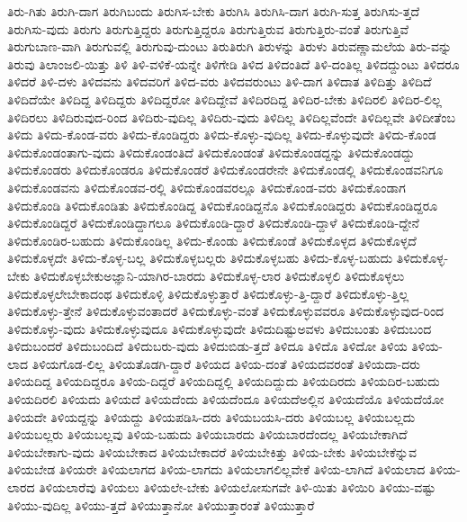 {ತಿರು-ಗಿತು
ತಿರುಗಿ-ದಾಗ
ತಿರುಗಿಬಂದು
ತಿರುಗಿಸ-ಬೇಕು
ತಿರುಗಿಸಿ
ತಿರುಗಿಸಿ-ದಾಗ
ತಿರುಗಿ-ಸುತ್ತ
ತಿರುಗಿಸು-ತ್ತದೆ
ತಿರುಗಿಸು-ವುದು
ತಿರುಗು
ತಿರುಗುತ್ತಿದ್ದರು
ತಿರುಗುತ್ತಿದ್ದರೂ
ತಿರುಗುತ್ತಿರುವ
ತಿರುಗುತ್ತಿರು-ವಂತೆ
ತಿರುಗುತ್ತಿವೆ
ತಿರುಗುಬಾಣ-ವಾಗಿ
ತಿರುಗುವಲ್ಲಿ
ತಿರುಗುವು-ದುಂಟು
ತಿರುತಿರುಗಿ
ತಿರುಳನ್ನು
ತಿರುಳು
ತಿರುವಣ್ಣಾಮಲೆಯ
ತಿರು-ವನ್ನು
ತಿರುವು
ತಿಲಾಂಜಲಿ-ಯಿತ್ತು
ತಿಳಿ
ತಿಳಿ-ವಳಿಕೆ-ಯನ್ನೇ
ತಿಳಿಗೇಡಿ
ತಿಳಿದ
ತಿಳಿದಂತಿದೆ
ತಿಳಿ-ದಂತಿಲ್ಲ
ತಿಳಿದದ್ದುಂಟು
ತಿಳಿದರೂ
ತಿಳಿದರೆ
ತಿಳಿ-ದಳು
ತಿಳಿದವನು
ತಿಳಿದವರಿಗೆ
ತಿಳಿದ-ವರು
ತಿಳಿದವರುಂಟು
ತಿಳಿ-ದಾಗ
ತಿಳಿದಾತ
ತಿಳಿದಿತ್ತು
ತಿಳಿದಿದೆ
ತಿಳಿದಿದೆಯೇ
ತಿಳಿದಿದ್ದ
ತಿಳಿದಿದ್ದರು
ತಿಳಿದಿದ್ದರೋ
ತಿಳಿದಿದ್ದೇವೆ
ತಿಳಿದಿರದಿದ್ದ
ತಿಳಿದಿರ-ಬೇಕು
ತಿಳಿದಿರಲಿ
ತಿಳಿದಿರ-ಲಿಲ್ಲ
ತಿಳಿದಿರಲು
ತಿಳಿದಿರುವುದ-ರಿಂದ
ತಿಳಿದಿರು-ವುದಿಲ್ಲ
ತಿಳಿದಿರು-ವುದು
ತಿಳಿದಿಲ್ಲ
ತಿಳಿದಿಲ್ಲವೆಂದೇ
ತಿಳಿದಿಲ್ಲವೇ
ತಿಳಿದೀತೆಂಬ
ತಿಳಿದು
ತಿಳಿದು-ಕೊಂಡ-ವರು
ತಿಳಿದು-ಕೊಂಡಿದ್ದರು
ತಿಳಿದು-ಕೊಳ್ಳು-ವುದಿಲ್ಲ
ತಿಳಿದು-ಕೊಳ್ಳುವುದೇ
ತಿಳಿದು-ಕೊಂಡ
ತಿಳಿದುಕೊಂಡಂತಾಗು-ವುದು
ತಿಳಿದುಕೊಂಡಂತಿದೆ
ತಿಳಿದುಕೊಂಡಂತೆ
ತಿಳಿದುಕೊಂಡದ್ದನ್ನು
ತಿಳಿದುಕೊಂಡದ್ದು
ತಿಳಿದುಕೊಂಡರು
ತಿಳಿದುಕೊಂಡರೂ
ತಿಳಿದುಕೊಂಡರೆ
ತಿಳಿದುಕೊಂಡರೇನೇ
ತಿಳಿದುಕೊಂಡಲ್ಲಿ
ತಿಳಿದುಕೊಂಡವನಿಗೂ
ತಿಳಿದುಕೊಂಡವನು
ತಿಳಿದುಕೊಂಡವ-ರಲ್ಲಿ
ತಿಳಿದುಕೊಂಡವರಲ್ಲೂ
ತಿಳಿದುಕೊಂಡ-ವರು
ತಿಳಿದುಕೊಂಡಾಗ
ತಿಳಿದುಕೊಂಡಿ
ತಿಳಿದುಕೊಂಡಿತು
ತಿಳಿದುಕೊಂಡಿದ್ದ
ತಿಳಿದುಕೊಂಡಿದ್ದನೊ
ತಿಳಿದುಕೊಂಡಿದ್ದರು
ತಿಳಿದುಕೊಂಡಿದ್ದರೂ
ತಿಳಿದುಕೊಂಡಿದ್ದರೆ
ತಿಳಿದುಕೊಂಡಿದ್ದಾಗಲೂ
ತಿಳಿದುಕೊಂಡಿ-ದ್ದಾರೆ
ತಿಳಿದುಕೊಂಡಿ-ದ್ದಾಳೆ
ತಿಳಿದುಕೊಂಡಿ-ದ್ದೇನೆ
ತಿಳಿದುಕೊಂಡಿರ-ಬಹುದು
ತಿಳಿದುಕೊಂಡಿಲ್ಲ
ತಿಳಿದು-ಕೊಂಡು
ತಿಳಿದುಕೊಂಡೆ
ತಿಳಿದುಕೊಳ್ಳದ
ತಿಳಿದುಕೊಳ್ಳದೆ
ತಿಳಿದುಕೊಳ್ಳದೇ
ತಿಳಿದು-ಕೊಳ್ಳ-ಬಲ್ಲ
ತಿಳಿದುಕೊಳ್ಳಬಲ್ಲರು
ತಿಳಿದುಕೊಳ್ಳಬಹು
ತಿಳಿದು-ಕೊಳ್ಳ-ಬಹುದು
ತಿಳಿದುಕೊಳ್ಳ-ಬೇಕು
ತಿಳಿದುಕೊಳ್ಳಬೇಕುಅಜ್ಞಾನಿ-ಯಾಗಿರ-ಬಾರದು
ತಿಳಿದುಕೊಳ್ಳ-ಲಾರ
ತಿಳಿದುಕೊಳ್ಳಲಿ
ತಿಳಿದುಕೊಳ್ಳಲು
ತಿಳಿದುಕೊಳ್ಳಲೇಬೇಕಾದಂಥ
ತಿಳಿದುಕೊಳ್ಳಿ
ತಿಳಿದುಕೊಳ್ಳುತ್ತಾರೆ
ತಿಳಿದುಕೊಳ್ಳು-ತ್ತಿ-ದ್ದಾರೆ
ತಿಳಿದುಕೊಳ್ಳು-ತ್ತಿಲ್ಲ
ತಿಳಿದುಕೊಳ್ಳು-ತ್ತೇನೆ
ತಿಳಿದುಕೊಳ್ಳುವಂತಾದರೆ
ತಿಳಿದುಕೊಳ್ಳು-ವಂತೆ
ತಿಳಿದುಕೊಳ್ಳುವವರೂ
ತಿಳಿದುಕೊಳ್ಳುವುದ-ರಿಂದ
ತಿಳಿದುಕೊಳ್ಳು-ವುದು
ತಿಳಿದುಕೊಳ್ಳುವುದೂ
ತಿಳಿದುಕೊಳ್ಳುವುದೇ
ತಿಳಿದುದಿಷ್ಟುಅವಳು
ತಿಳಿದುಬಂತು
ತಿಳಿದುಬಂದ
ತಿಳಿದುಬಂದರೆ
ತಿಳಿದುಬಂದಿದೆ
ತಿಳಿದುಬರು-ವುದು
ತಿಳಿದುಬಿಡು-ತ್ತದೆ
ತಿಳಿದೂ
ತಿಳಿದೊ
ತಿಳಿದೋ
ತಿಳಿಯ
ತಿಳಿಯ-ಲಾದ
ತಿಳಿಯಗೊಡ-ಲಿಲ್ಲ
ತಿಳಿಯತೊಡಗಿ-ದ್ದಾರೆ
ತಿಳಿಯದ
ತಿಳಿಯ-ದಂತೆ
ತಿಳಿಯದವರಂತೆ
ತಿಳಿಯದಾ-ದರು
ತಿಳಿಯದಿದ್ದ
ತಿಳಿಯದಿದ್ದರೂ
ತಿಳಿಯ-ದಿದ್ದರೆ
ತಿಳಿಯದಿದ್ದಲ್ಲಿ
ತಿಳಿಯದಿದ್ದುದು
ತಿಳಿಯದಿರದು
ತಿಳಿಯದಿರ-ಬಹುದು
ತಿಳಿಯದಿರಲಿ
ತಿಳಿಯದು
ತಿಳಿಯದೆ
ತಿಳಿಯದೆಂದು
ತಿಳಿಯದೆಂದೂ
ತಿಳಿಯದೆಅಲ್ಲಿನ
ತಿಳಿಯದೆಯೊ
ತಿಳಿಯದೆಯೋ
ತಿಳಿಯದೇ
ತಿಳಿಯದ್ದನ್ನು
ತಿಳಿಯದ್ದು
ತಿಳಿಯಪಡಿಸಿ-ದರು
ತಿಳಿಯಬಯಸಿ-ದರು
ತಿಳಿಯಬಲ್ಲ
ತಿಳಿಯಬಲ್ಲದು
ತಿಳಿಯಬಲ್ಲರು
ತಿಳಿಯಬಲ್ಲವು
ತಿಳಿಯ-ಬಹುದು
ತಿಳಿಯಬಾರದು
ತಿಳಿಯಬಾರದೆಂದಲ್ಲ
ತಿಳಿಯಬೇಕಾಗಿದೆ
ತಿಳಿಯಬೇಕಾಗು-ವುದು
ತಿಳಿಯಬೇಕಾದ
ತಿಳಿಯಬೇಕಾದರೆ
ತಿಳಿಯಬೇಕಿತ್ತು
ತಿಳಿಯ-ಬೇಕು
ತಿಳಿಯಬೇಕೆನ್ನುವ
ತಿಳಿಯಬೇಡ
ತಿಳಿಯರೇ
ತಿಳಿಯಲಾಗದ
ತಿಳಿಯ-ಲಾಗದು
ತಿಳಿಯಲಾಗಲಿಲ್ಲವೇಕೆ
ತಿಳಿಯ-ಲಾಗಿದೆ
ತಿಳಿಯಲಾದ
ತಿಳಿಯ-ಲಾರದ
ತಿಳಿಯಲಾರೆವು
ತಿಳಿಯಲು
ತಿಳಿಯಲೇ-ಬೇಕು
ತಿಳಿಯಲೋಸುಗವೇ
ತಿಳಿ-ಯಿತು
ತಿಳಿಯಿರಿ
ತಿಳಿಯು-ವಷ್ಟು
ತಿಳಿಯು-ವುದಿಲ್ಲ
ತಿಳಿಯು-ತ್ತದೆ
ತಿಳಿಯುತ್ತಾನೋ
ತಿಳಿಯುತ್ತಾರಂತೆ
ತಿಳಿಯುತ್ತಾರೆ
}
